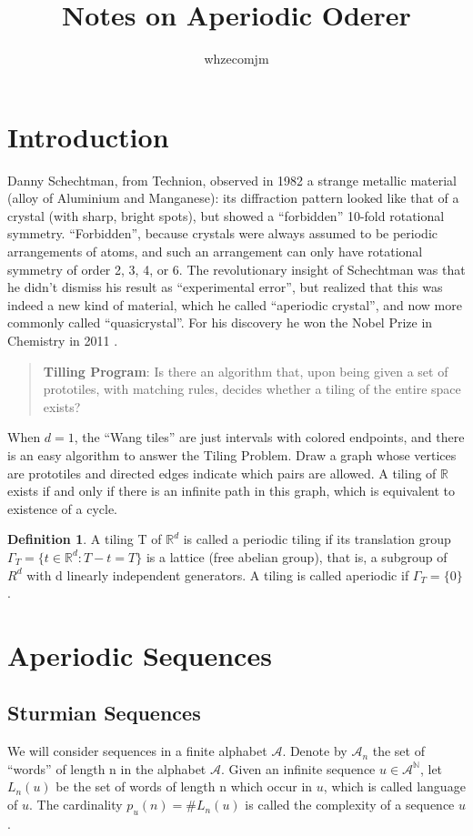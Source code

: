 \documentclass{article}
\title{Notes on Aperiodic Oderer}
\author{whzecomjm}
\theoremstyle{plain}
\theoremstyle{definition}
\newtheorem{defn}{Definition}[section]
\theoremstyle{remark}
\newcommand{\R}{\mathbb R}
\begin{document}
\maketitle
\section{Introduction}

Danny Schechtman, from Technion, observed in 1982 a strange metallic material (alloy of Aluminium and Manganese): its diffraction pattern looked like that of a crystal (with sharp, bright spots), but showed a “forbidden” 10-fold rotational symmetry. “Forbidden”, because crystals were always assumed to be periodic arrangements of atoms, and such an arrangement can only have rotational symmetry of order 2, 3, 4, or 6. The revolutionary insight of Schechtman was that he didn’t dismiss his result as “experimental error”, but realized that this was indeed a new kind of material, which he called “aperiodic crystal”, and now more commonly called “quasicrystal”. For his discovery he won the Nobel Prize in Chemistry in 2011 \cite{solo1}.



\begin{quote}
\textbf{Tilling Program}: Is there an algorithm that, upon being given a set of prototiles, with matching rules, decides whether a tiling of the entire space exists?
\end{quote}

When $d = 1$, the “Wang tiles” are just intervals with colored endpoints, and there is an easy algorithm to answer the Tiling Problem. Draw a graph whose vertices are prototiles and directed edges indicate which pairs are allowed. A tiling of $\mathbb{R}$ exists if and only if there is an infinite path in this graph, which is equivalent to existence of a cycle.

\begin{defn}
A tiling T of $\R^d$ is called a periodic tiling if its translation group $\Gamma_{T} =\{t \in\mathbb{R}^d: T-t =T \}$ is a lattice (free abelian group), that is, a subgroup of $R^d$ with d linearly independent generators. A tiling is called aperiodic if $\Gamma_T = \{0\}$.
\end{defn}


\section{Aperiodic Sequences}
\subsection{Sturmian Sequences}
We will consider sequences in a finite alphabet $\mathcal{A}$. Denote by $\mathcal{A}_n$ the set of “words” of length n in the alphabet $\mathcal{A}$. Given an infinite sequence $u\in\mathcal{A}^{\mathbb{N}}$, let $L_n(u)$ be the set of words of length n which occur in $u$, which is called language of $u$. The cardinality $p_u(n) = \#L_n(u)$
is called the complexity of a sequence $u$.
\end{document}
